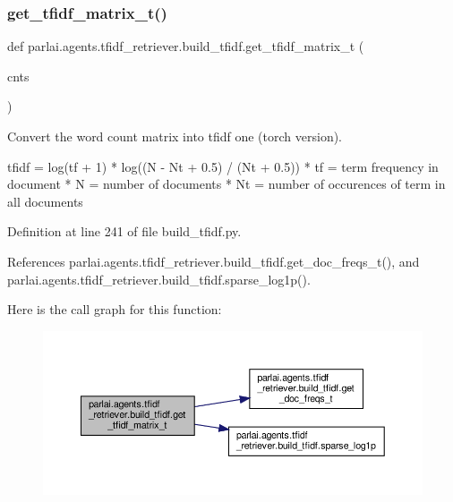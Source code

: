 \subsubsection{\texorpdfstring{get\+\_\+tfidf\+\_\+matrix\+\_\+t()}{get\_tfidf\_matrix\_t()}}
{\footnotesize\ttfamily def parlai.\+agents.\+tfidf\+\_\+retriever.\+build\+\_\+tfidf.\+get\+\_\+tfidf\+\_\+matrix\+\_\+t (\begin{DoxyParamCaption}\item[{}]{cnts }\end{DoxyParamCaption})}

\begin{DoxyVerb}Convert the word count matrix into tfidf one (torch version).

tfidf = log(tf + 1) * log((N - Nt + 0.5) / (Nt + 0.5))
* tf = term frequency in document
* N = number of documents
* Nt = number of occurences of term in all documents
\end{DoxyVerb}
 

Definition at line 241 of file build\+\_\+tfidf.\+py.



References parlai.\+agents.\+tfidf\+\_\+retriever.\+build\+\_\+tfidf.\+get\+\_\+doc\+\_\+freqs\+\_\+t(), and parlai.\+agents.\+tfidf\+\_\+retriever.\+build\+\_\+tfidf.\+sparse\+\_\+log1p().

Here is the call graph for this function\+:
\nopagebreak
\begin{figure}[H]
\begin{center}
\leavevmode
\includegraphics[width=350pt]{namespaceparlai_1_1agents_1_1tfidf__retriever_1_1build__tfidf_a3cd67edc9bfd76a8eeb49add2de75019_cgraph}
\end{center}
\end{figure}
\mbox{\label{namespaceparlai_1_1agents_1_1tfidf__retriever_1_1build__tfidf_a297d8a6b3ed43b31feccf5707517fee3}} 
